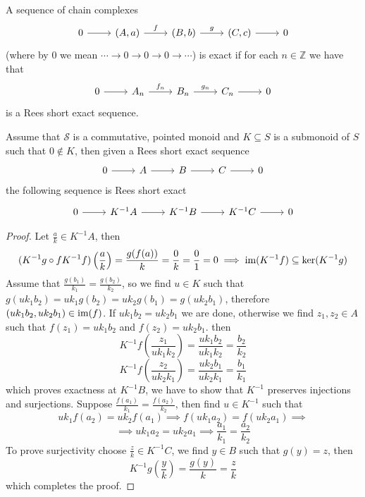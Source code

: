 \begin{definition}
    A sequence of chain complexes 
\[\begin{tikzcd}
	0 & {(A,a)} & {(B,b)} & {(C,c)} & 0
	\arrow[from=1-1, to=1-2]
	\arrow["f", from=1-2, to=1-3]
	\arrow["g", from=1-3, to=1-4]
	\arrow[from=1-4, to=1-5]
\end{tikzcd}\]
    (where by $0$ we mean $\cdots\to 0\to0\to0\to\cdots$) is exact 
    if for each $n\in\mathbb{Z}$ we have that 
    \[\begin{tikzcd}
	0 & {A_n} & {B_n} & {C_n} & 0
        \arrow[from=1-1, to=1-2]
        \arrow["{f_n}", from=1-2, to=1-3]
        \arrow["{g_n}", from=1-3, to=1-4]
        \arrow[from=1-4, to=1-5]
    \end{tikzcd}\]
    is a Rees short exact sequence.
\end{definition}
\begin{proposition}
    Assume that $\mathcal{S}$ is a commutative, pointed monoid and $K\subseteq S$ is a submonoid of $S$ such that $0\not\in K$, then
    given a Rees short exact sequence 
    \[\begin{tikzcd}
        0 & A & B & C & 0
        \arrow[from=1-1, to=1-2]
        \arrow[from=1-2, to=1-3]
        \arrow[from=1-3, to=1-4]
        \arrow[from=1-4, to=1-5]
    \end{tikzcd}\]
    the following sequence is Rees short exact
    \[\begin{tikzcd}
        0 & {K^{-1}A} & {K^{-1}B} & {K^{-1}C} & 0
        \arrow[from=1-1, to=1-2]
        \arrow[from=1-2, to=1-3]
        \arrow[from=1-3, to=1-4]
        \arrow[from=1-4, to=1-5]
    \end{tikzcd}\]
\end{proposition}
\begin{proof}[Proof]
    Let $\frac{a}{k}\in K^{-1}A$, then 
    \[
    (K^{-1}g\circ fK^{-1}f)\left(\frac{a}{k}\right) = \frac{g(f(a))}{k} = \frac{0}{k} =\frac{0}{1}=0 \implies \text{im}(K^{-1}f)\subseteq\mathrm{ker}(K^{-1}g)
    \]
    Assume that $\frac{g(b_1)}{k_1}=\frac{g(b_2)}{k_2}$, so we find $u\in K$ such that 
    $g(uk_1b_2)=uk_1g(b_2)=uk_2g(b_1)=g(uk_2b_1)$, therefore 
    $(uk_1b_2,uk_2b_1)\in\text{im}(f)$. If $uk_1b_2=uk_2b_1$ we are done, otherwise 
    we find $z_1,z_2\in A$ such that $f(z_1) = uk_1b_2$ and $f(z_2)=uk_2b_1$.
    then 
    \[
        K^{-1}f\left(\frac{z_1}{uk_1k_2}\right) = \frac{uk_1b_2}{uk_1k_2} = \frac{b_2}{k_2}
    \] 
    \[
        K^{-1}f\left(\frac{z_2}{uk_2k_1}\right) = \frac{uk_2b_1}{uk_2k_1} = \frac{b_1}{k_1}
    \]
    which proves exactness at $K^{-1}B$, we have to show that $K^{-1}$ preserves injections and surjections.
    Suppose $\frac{f(a_1)}{k_1}=\frac{f(a_2)}{k_2}$, then find $u\in K^{-1}$ such that 
    \[
        uk_1f(a_2) = uk_2f(a_1)\implies f(uk_1a_2)=f(uk_2a_1) \implies
    \] 
    \[
        \implies uk_1a_2=uk_2a_1 \implies\frac{a_1}{k_1}=\frac{a_2}{k_2}
    \]
    To prove surjectivity choose $\frac{z}{k}\in K^{-1}C$, we find $y\in B$ such that $g(y)=z$, then 
    \[
        K^{-1}g\left(\frac{y}{k}\right) = \frac{g(y)}{k} = \frac{z}{k}
    \]
    which completes the proof.
\end{proof}
